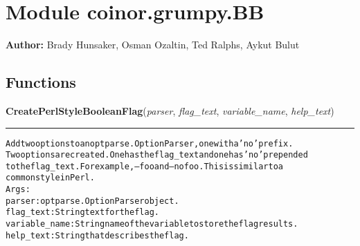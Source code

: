 %
%
%


\section{Module coinor.grumpy.BB}

    \label{coinor:grumpy:BB}
\textbf{Author:} Brady Hunsaker, Osman Ozaltin, Ted Ralphs, Aykut Bulut





  \subsection{Functions}

    \label{coinor:grumpy:BB:CreatePerlStyleBooleanFlag}

    \vspace{0.5ex}

\hspace{.8\funcindent}\begin{boxedminipage}{\funcwidth}

    \raggedright \textbf{CreatePerlStyleBooleanFlag}(\textit{parser}, \textit{flag\_text}, \textit{variable\_name}, \textit{help\_text})

    \vspace{-1.5ex}

    \rule{\textwidth}{0.5\fboxrule}
\setlength{\parskip}{2ex}
\begin{alltt}

Add two options to an optparse.OptionParser, one with a 'no' prefix.
Two options are created.  One has the flag\_text and one has 'no' prepended
to the flag\_text.  For example, --foo and --nofoo.  This is similar to a
common style in Perl.
Args:
  parser: optparse.OptionParser object.
  flag\_text: String text for the flag.
  variable\_name: String name of the variable to store the flag results.
  help\_text: String that describes the flag.
\end{alltt}

\setlength{\parskip}{1ex}
    \end{boxedminipage}

